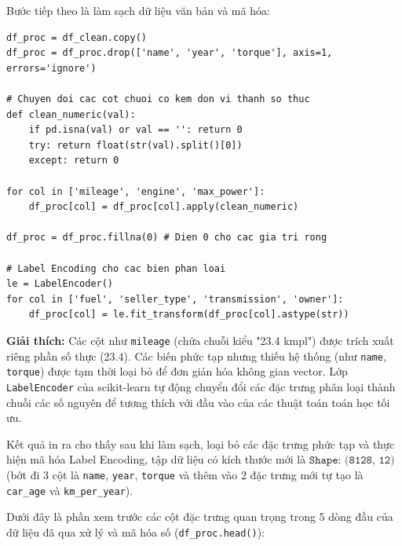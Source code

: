 Bước tiếp theo là làm sạch dữ liệu văn bản và mã hóa:

\begin{lstlisting}[style=pythoncode, caption={Làm sạch dữ liệu và mã hóa Label Encoding}]
df_proc = df_clean.copy()
df_proc = df_proc.drop(['name', 'year', 'torque'], axis=1, errors='ignore')

# Chuyen doi cac cot chuoi co kem don vi thanh so thuc
def clean_numeric(val):
    if pd.isna(val) or val == '': return 0
    try: return float(str(val).split()[0])
    except: return 0

for col in ['mileage', 'engine', 'max_power']:
    df_proc[col] = df_proc[col].apply(clean_numeric)

df_proc = df_proc.fillna(0) # Dien 0 cho cac gia tri rong

# Label Encoding cho cac bien phan loai
le = LabelEncoder()
for col in ['fuel', 'seller_type', 'transmission', 'owner']:
    df_proc[col] = le.fit_transform(df_proc[col].astype(str))
\end{lstlisting}

\textbf{Giải thích:} Các cột như \texttt{mileage} (chứa chuỗi kiểu "23.4 kmpl") được trích xuất riêng phần số thực (23.4). Các biến phức tạp nhưng thiếu hệ thống (như \texttt{name}, \texttt{torque}) được tạm thời loại bỏ để đơn giản hóa không gian vector. Lớp \texttt{LabelEncoder} của scikit-learn tự động chuyển đổi các đặc trưng phân loại thành chuỗi các số nguyên để tương thích với đầu vào của các thuật toán toán học tối ưu.

Kết quả in ra cho thấy sau khi làm sạch, loại bỏ các đặc trưng phức tạp và thực hiện mã hóa Label Encoding, tập dữ liệu có kích thước mới là $\texttt{Shape: (8128, 12)}$ (bớt đi 3 cột là \texttt{name}, \texttt{year}, \texttt{torque} và thêm vào 2 đặc trưng mới tự tạo là \texttt{car\_age} và \texttt{km\_per\_year}).

Dưới đây là phần xem trước các cột đặc trưng quan trọng trong 5 dòng đầu của dữ liệu đã qua xử lý và mã hóa số (\texttt{df\_proc.head()}):

